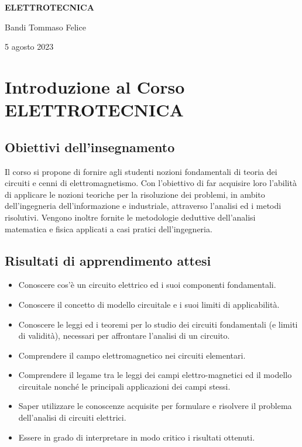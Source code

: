 \documentclass[12pt, a4paper]{article}
\begin{document}
\begin{titlepage}
    \centering
    \vspace*{4cm}
    {\Huge \bfseries ELETTROTECNICA \par}
    \vspace{1.5cm}
    {\Large Bandi Tommaso Felice \par}
    \vspace{0.5cm}
    {\large 5 agosto 2023 \par}
\end{titlepage}

\tableofcontents
\newpage

\section{Introduzione al Corso ELETTROTECNICA}

\subsection{Obiettivi dell'insegnamento}
Il corso si propone di fornire agli studenti nozioni fondamentali di teoria dei circuiti e cenni di elettromagnetismo. Con l'obiettivo di far acquisire loro l'abilità di applicare le nozioni teoriche per la risoluzione dei problemi, in ambito dell'ingegneria dell'informazione e industriale, attraverso l'analisi ed i metodi risolutivi. Vengono inoltre fornite le metodologie deduttive dell'analisi matematica e fisica applicati a casi pratici dell'ingegneria.

\subsection{Risultati di apprendimento attesi}
\begin{itemize}
    \item Conoscere cos'è un circuito elettrico ed i suoi componenti fondamentali.
    \item Conoscere il concetto di modello circuitale e i suoi limiti di applicabilità.
    \item Conoscere le leggi ed i teoremi per lo studio dei circuiti fondamentali (e limiti di validità), necessari per affrontare l'analisi di un circuito.
    \item Comprendere il campo elettromagnetico nei circuiti elementari.
    \item Comprendere il legame tra le leggi dei campi elettro-magnetici ed il modello circuitale nonché le principali applicazioni dei campi stessi.
    \item Saper utilizzare le conoscenze acquisite per formulare e risolvere il problema dell'analisi di circuiti elettrici.
    \item Essere in grado di interpretare in modo critico i risultati ottenuti.
\end{itemize}
\end{document}
